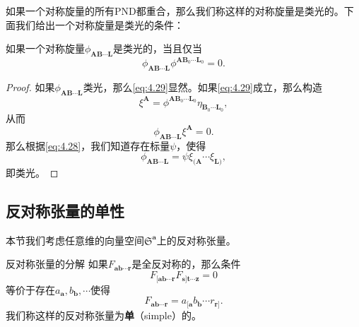 如果一个对称旋量的所有PND都重合，那么我们称这样的对称旋量是类光的。下面我们给出一个对称旋量是类光的条件：

\begin{them}[label={them:3.11}]{}
	如果一个对称旋量$\phi _{\boldsymbol{AB} \cdots \boldsymbol{L}}$是类光的，当且仅当
	\begin{equation}
		\phi _{\boldsymbol{AB} \cdots \boldsymbol{L}} \phi ^{\boldsymbol{AB}_{0} \cdots \boldsymbol{L}_{0}} =0.
		\label{eq:4.29}
	\end{equation}
\end{them}

\begin{proof}
	如果$\phi _{\boldsymbol{AB} \cdots \boldsymbol{L}}$类光，那么\ref{eq:4.29}显然。如果\ref{eq:4.29}成立，那么构造
	\begin{equation*}
		\xi ^{\boldsymbol{A}} =\phi ^{\boldsymbol{AB}_{0} \cdots \boldsymbol{L}_{0}} \eta _{\boldsymbol{B}_{0} \cdots \boldsymbol{L}_{0}} ,
	\end{equation*}
	从而
	\begin{equation*}
		\phi _{\boldsymbol{AB} \cdots \boldsymbol{L}} \xi ^{\boldsymbol{A}} =0.
	\end{equation*}
	那么根据\ref{eq:4.28}，我们知道存在标量$\psi $，使得
	\begin{equation*}
		\phi _{\boldsymbol{AB} \cdots \boldsymbol{L}} =\psi \xi _{(\boldsymbol{A}} \cdots \xi _{\boldsymbol{L})} ,
	\end{equation*}
	即类光。
\end{proof}


\subsection{反对称张量的单性}

本节我们考虑任意维的向量空间$\mathfrak{S}^{\boldsymbol{a}}$上的反对称张量。 

\begin{them}[label={them:decomposition of antisymmetric spinor}]{反对称张量的分解}
	如果$F_{\boldsymbol{ab} \cdots \boldsymbol{r}}$是全反对称的，那么条件
	\begin{equation}
		F_{[\boldsymbol{ab} \cdots \boldsymbol{r}} F_{\boldsymbol{s}]\boldsymbol{t} \cdots \boldsymbol{z}} =0
		\label{eq:4.30}
	\end{equation}
	等价于存在$a_{\boldsymbol{a}} ,b_{\boldsymbol{b}} ,\cdots $使得
	\begin{equation}
		F_{\boldsymbol{ab} \cdots \boldsymbol{r}} =a_{[\boldsymbol{a}} b_{\boldsymbol{b}} \cdots r_{\boldsymbol{r}]} .
		\label{eq:4.31}
	\end{equation}
	我们称这样的反对称张量为\textbf{单}（simple）的。
\end{them}

